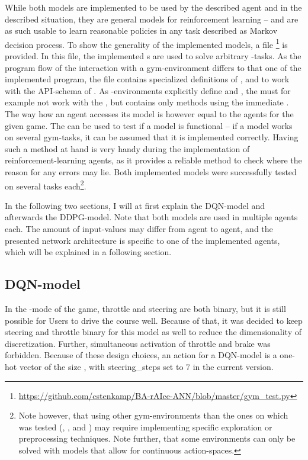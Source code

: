 While both models are implemented to be used by the described agent and in the described situation, they are general models for reinforcement learning -- and are as such usable to learn reasonable policies in any task described as Markov decision process. To show the generality of the implemented models, a file \footnote{\url{https://github.com/cstenkamp/BA-rAIce-ANN/blob/master/gym\_test.py}} is provided. In this file, the implemented s are used to solve arbitrary -tasks. As the program flow of the interaction with a gym-environment differs to that one of the implemented program, the file contains specialized definitions of ,  and  to work with the API-schema of . As -environments explicitly define  and , the  must for example not work with the , but contains only methods using the immediate . The way how an agent accesses its model is however equal to the agents for the given game. The  can be used to test if a model is functional -- if a model works on several gym-tasks, it can be assumed that it is implemented correctly. Having such a method at hand is very handy during the implementation of reinforcement-learning agents, as it provides a reliable method to check where the reason for any errors may lie. Both implemented models were successfully tested on several tasks each\footnote{Note however, that using other gym-environments than the ones on which was tested (, ,  and ) may require implementing specific exploration or preprocessing techniques. Note further, that some environments can only be solved with models that allow for continuous action-spaces.}.


In the following two sections, I will at first explain the DQN-model and afterwards the DDPG-model. Note that both models are used in multiple agents each. The amount of input-values may differ from agent to agent, and the presented network architecture is specific to one of the implemented agents, which will be explained in a following section.


\subsection{DQN-model}

In the -mode of the game, throttle and steering are both binary, but it is still possible for Users to drive the course well. Because of that, it was decided to keep steering and throttle binary for this model as well to reduce the dimensionality of discretization. Further, simultaneous activation of throttle and brake was forbidden. Because of these design choices, an action for a DQN-model is a one-hot vector of the size , with steering\_steps set to 7 in the current version. 

